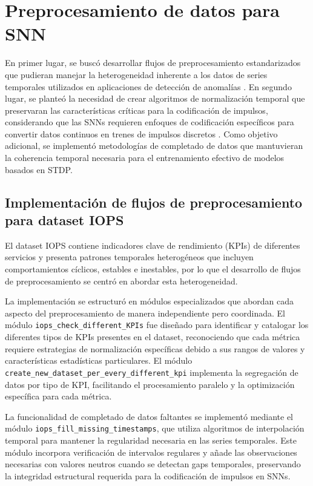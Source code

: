 \section{Preprocesamiento de datos para SNN}

En primer lugar, se buscó desarrollar flujos de preprocesamiento estandarizados que pudieran manejar la heterogeneidad inherente a los datos de series temporales utilizados en aplicaciones de detección de anomalías \cite{milvus2025anomaly}. En segundo lugar, se planteó la necesidad de crear algoritmos de normalización temporal que preservaran las características críticas para la codificación de impulsos, considerando que las SNNs requieren enfoques de codificación específicos para convertir datos continuos en trenes de impulsos discretos \cite{lv_efficient_2024}. Como objetivo adicional, se implementó metodologías de completado de datos que mantuvieran la coherencia temporal necesaria para el entrenamiento efectivo de modelos basados en STDP.

\subsection{Implementación de flujos de preprocesamiento para dataset IOPS}

El dataset IOPS contiene indicadores clave de rendimiento (KPIs) de diferentes servicios y presenta patrones temporales heterogéneos que incluyen comportamientos cíclicos, estables e inestables, por lo que el desarrollo de flujos de preprocesamiento se centró en abordar esta heterogeneidad. 

La implementación se estructuró en módulos especializados que abordan cada aspecto del preprocesamiento de manera independiente pero coordinada. El módulo \texttt{iops\_check\_different\_KPIs} fue diseñado para identificar y catalogar los diferentes tipos de KPIs presentes en el dataset, reconociendo que cada métrica requiere estrategias de normalización específicas debido a sus rangos de valores y características estadísticas particulares. El módulo \texttt{create\_new\_dataset\_per\_every\_different\_kpi} implementa la segregación de datos por tipo de KPI, facilitando el procesamiento paralelo y la optimización específica para cada métrica. 

La funcionalidad de completado de datos faltantes se implementó mediante el módulo \texttt{iops\_fill\_missing\_timestamps}, que utiliza algoritmos de interpolación temporal para mantener la regularidad necesaria en las series temporales. Este módulo incorpora verificación de intervalos regulares y añade las observaciones necesarias con valores neutros cuando se detectan gaps temporales, preservando la integridad estructural requerida para la codificación de impulsos en SNNs. 

